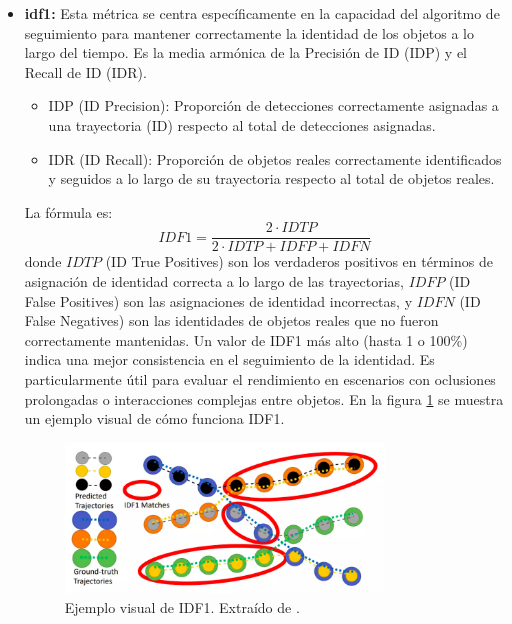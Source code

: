 \documentclass[11pt,spanish,listoffigures,listoftables]{tfgetsinf}
\begin{document}
\begin{itemize}
   \item \textbf{\gls{idf1}\cite{ristani2016performancemeasuresdataset}:} Esta métrica se centra específicamente en la capacidad del algoritmo de seguimiento para mantener correctamente la identidad de los objetos a lo largo del tiempo. Es la media armónica de la Precisión de ID (IDP) y el Recall de ID (IDR).
   \begin{itemize}
     \item IDP (ID Precision): Proporción de detecciones correctamente asignadas a una trayectoria (ID) respecto al total de detecciones asignadas.
     \item IDR (ID Recall): Proporción de objetos reales correctamente identificados y seguidos a lo largo de su trayectoria respecto al total de objetos reales.
   \end{itemize}
   La fórmula es:
   \begin{equation}
   IDF1 = \frac{2 \cdot IDTP}{2 \cdot IDTP + IDFP + IDFN}
   \end{equation}
   donde \(IDTP\) (ID True Positives) son los verdaderos positivos en términos de asignación de identidad correcta a lo largo de las trayectorias, \(IDFP\) (ID False Positives) son las asignaciones de identidad incorrectas, y \(IDFN\) (ID False Negatives) son las identidades de objetos reales que no fueron correctamente mantenidas. Un valor de IDF1 más alto (hasta 1 o 100\%) indica una mejor consistencia en el seguimiento de la identidad. Es particularmente útil para evaluar el rendimiento en escenarios con oclusiones prolongadas o interacciones complejas entre objetos. En la figura \ref{fig:idf1_example} se muestra un ejemplo visual de cómo funciona IDF1.


   \begin{figure}[H]
      \centering
      \includegraphics[width=0.8\textwidth]{images/estado_del_arte/IDF1.png}
      \caption[Ejemplo visual de IDF1]{Ejemplo visual de IDF1. Extraído de \cite[fig. 10, p.~20]{hota_paper}.}
      \label{fig:idf1_example}      
   \end{figure}




\end{itemize}
\end{document}
